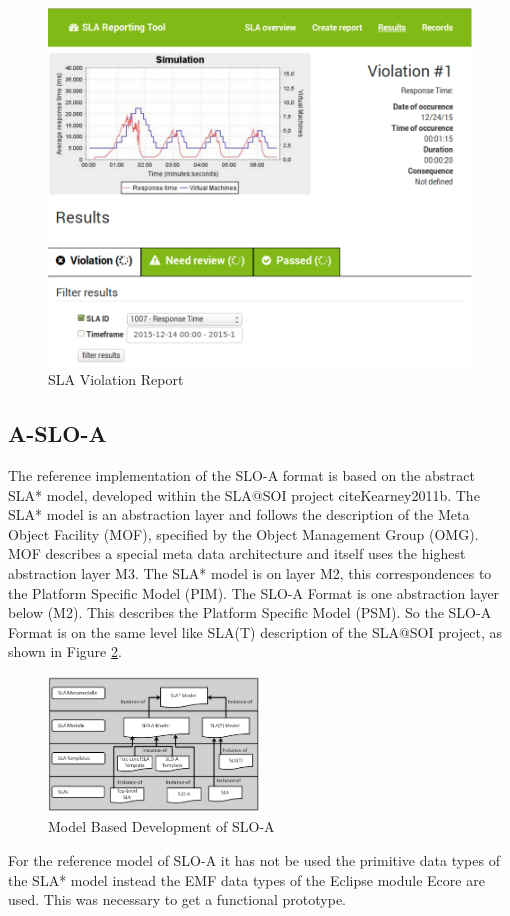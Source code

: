 \begin{figure}[ht]
	\centering
	\includegraphics[width=0.7\linewidth]{chapters/chapter5/fig/Gui2}
	\caption{SLA Violation Report}
	\label{fig:gui2}
\end{figure}


\subsection{A-SLO-A}
The reference implementation of the SLO-A format is based on the abstract SLA* model, developed within the SLA@SOI project cite{Kearney2011b}. The SLA* model is an abstraction layer and follows the description of the Meta Object Facility (MOF), specified by the Object Management Group (OMG). MOF describes a special meta data architecture and itself uses the highest abstraction layer M3. The SLA* model is on layer M2, this correspondences to the Platform Specific Model (PIM). The SLO-A Format is one abstraction layer below (M2). This describes the Platform Specific Model (PSM). So the SLO-A Format is on the same level like SLA(T) description of the SLA@SOI project, as shown in Figure \ref{fig:mbd_SLOA}.
\begin{figure}[ht]
\includegraphics[width=0.5\textwidth]{fig/Modellbasierte_Entwicklung_Instanz.png}
\caption{Model Based Development of SLO-A}
\label{fig:mbd_SLOA}
\end{figure}
For the reference model of SLO-A it has not be used the primitive data types of the SLA* model instead the EMF data types of the Eclipse module Ecore are used. This was necessary to get a functional prototype.

